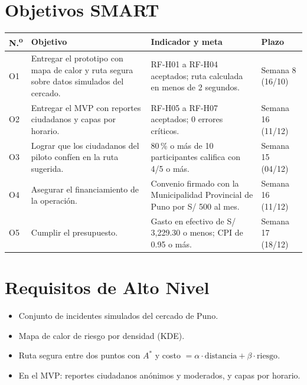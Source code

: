 \documentclass[11pt,a4paper]{article}
\begin{document}
\section{Objetivos SMART}
{\small
\noindent\begin{tabularx}{\textwidth}{@{}C{0.7cm} L L P{2.4cm}@{}}
\toprule
{}
\textbf{N.\textsuperscript{o}} & \textbf{Objetivo} & \textbf{Indicador y meta} & \textbf{Plazo} \\
\midrule
O1 & Entregar el prototipo con mapa de calor y ruta segura sobre datos simulados del cercado. & RF-H01 a RF-H04 aceptados; ruta calculada en menos de 2 segundos. & Semana 8 (16/10) \\
O2 & Entregar el MVP con reportes ciudadanos y capas por horario. & RF-H05 a RF-H07 aceptados; 0 errores críticos. & Semana 16 (11/12) \\
O3 & Lograr que los ciudadanos del piloto confíen en la ruta sugerida. & 80\,\% o más de 10 participantes califica con 4/5 o más. & Semana 15 (04/12) \\
O4 & Asegurar el financiamiento de la operación. & Convenio firmado con la Municipalidad Provincial de Puno por S/ 500 al mes. & Semana 16 (11/12) \\
O5 & Cumplir el presupuesto. & Gasto en efectivo de S/ 3,229.30 o menos; CPI de 0.95 o más. & Semana 17 (18/12) \\
\bottomrule
\end{tabularx}
}

\section{Requisitos de Alto Nivel}
\begin{itemize}[leftmargin=*]
    \item Conjunto de incidentes simulados del cercado de Puno.
    \item Mapa de calor de riesgo por densidad (KDE).
    \item Ruta segura entre dos puntos con $A^*$ y costo $= \alpha \cdot \text{distancia} + \beta \cdot \text{riesgo}$.
    \item En el MVP: reportes ciudadanos anónimos y moderados, y capas por horario.
\end{itemize}
\end{document}
